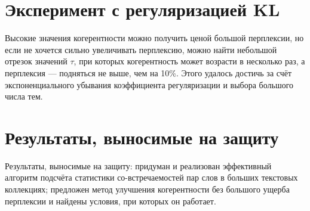 \documentclass[10pt]{extarticle}
\begin{document}
    \section{Эксперимент с регуляризацией KL}
    Высокие значения когерентности можно получить ценой большой перплексии, но если не хочется сильно увеличивать перплексию, можно найти небольшой отрезок значений $\tau$, при которых когерентность может возрасти в несколько раз, а перплексия --- подняться не выше, чем на 10\%. Этого удалось достичь за счёт экспоненциального убывания коэффициента регуляризации и выбора большого числа тем.
    \section{Результаты, выносимые на защиту}
    Результаты, выносимые на защиту: придуман и реализован эффективный алгоритм подсчёта статистики со-встречаемостей пар слов в больших текстовых коллекциях; предложен метод улучшения когерентности без большого ущерба перплексии и найдены условия, при которых он работает.
\end{document}
